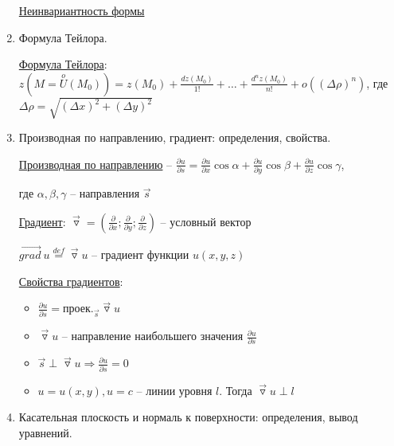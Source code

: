 \documentclass[12pt]{article}
\begin{document}
\begin{enumerate}
        \hyperlink{noninvariantofseconddifferentialoffunctionoftwovariables}{Неинвариантность формы}

        \item Формула Тейлора.

        \hyperlink{formulataylor}{Формула Тейлора}: $\displaystyle z(M = \stackrel{o}{U}(M_0)) = z(M_0) + \frac{dz(M_0)}{1!} + \dots + \frac{d^n z(M_0)}{n!} + o((\Delta \rho)^n)$,
        где $\Delta \rho = \sqrt{(\Delta x)^2 + (\Delta y)^2}$

        \item Производная по направлению, градиент: определения, свойства.

        \hyperlink{derivativeoffunctionindirection}{Производная по направлению} -- $\frac{\partial u}{\partial s} = \frac{\partial u}{\partial x} \cos\alpha + \frac{\partial u}{\partial y} \cos\beta + \frac{\partial u}{\partial z} \cos\gamma$,

        где $\alpha, \beta, \gamma$ -- направления $\overrightarrow{s}$

        \hyperlink{gradientdefinition}{Градиент}: $\overrightarrow{\triangledown} = \left(\frac{\partial}{\partial x}; \frac{\partial}{\partial y}; \frac{\partial}{\partial z}\right)$ -- условный вектор

        $\overrightarrow{grad} \ u \stackrel{def}{=} \overrightarrow{\triangledown} u$ -- градиент функции $u(x, y, z)$

        \hyperlink{gradientproperties}{Свойства градиентов}:

        \begin{itemize}
            \item $\frac{\partial u}{\partial s} = \text{проек.}_{\overrightarrow{s}} \overrightarrow{\triangledown} u$

            \item $\overrightarrow{\triangledown} u$ -- направление наибольшего значения $\frac{\partial u}{\partial s}$

            \item $\overrightarrow{s} \perp \overrightarrow{\triangledown} u \Longrightarrow \frac{\partial u}{\partial s} = 0$

            \item $u = u(x, y), u = c$ -- линии уровня $l$. Тогда $\overrightarrow{\triangledown} u \perp l$
        \end{itemize}


        \item Касательная плоскость и нормаль к поверхности: определения, вывод уравнений.


\end{enumerate}
\end{document}
